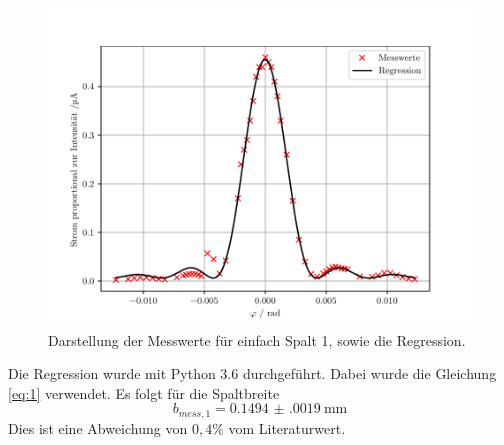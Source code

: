 \begin{figure}[H]
  \centering
  \includegraphics{plot1.pdf}
  \caption{Darstellung der Messwerte für einfach Spalt 1, sowie die Regression.}
  \label{abb:4}
\end{figure}

Die Regression wurde mit Python 3.6 durchgeführt.
Dabei wurde die Gleichung  \ref{eq:1} verwendet.
Es folgt für die Spaltbreite
\begin{equation*}
  b_{mess,1} = \SI{0.1494(0019)}{\milli\metre}
\end{equation*}
Dies ist eine Abweichung von $0,4\%$ vom Literaturwert.

